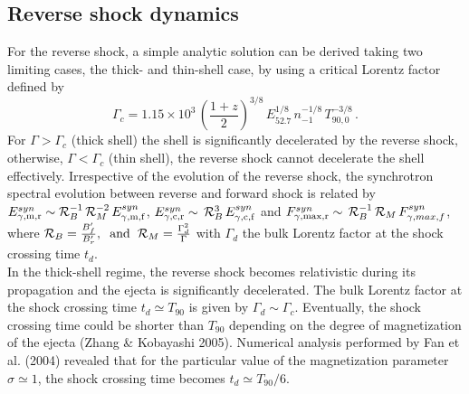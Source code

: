 \documentclass[11pt,twoside]{article}
\newcommand{\be}{\begin{equation}}
\newcommand{\ee}{\end{equation}}
\begin{document}
\subsection{Reverse shock dynamics}
%
For the reverse shock, a simple analytic solution can be derived taking two limiting cases, the thick- and thin-shell case, by using a critical Lorentz factor defined by 
%
\be
\Gamma_c=1.15\times 10^3\,\left(\frac{1+z}{2} \right)^{3/8}\, E^{1/8}_{52.7}\,n^{-1/8}_{-1}\,T_{90,0}^{-3/8}\,.
\ee
For $\Gamma>\Gamma_c$ (thick shell) the shell is significantly decelerated by the reverse shock, otherwise, $\Gamma<\Gamma_c$ (thin shell), the reverse shock cannot decelerate the shell effectively.    Irrespective of the evolution of the reverse shock,  the synchrotron  spectral evolution between reverse and forward shock is related by $E^{syn}_{\rm \gamma, m,r}\sim \mathcal{R}^{-1}_B\,\mathcal{R}^{-2}_M\,E^{syn}_{\rm \gamma,m,f}$,  $E^{syn}_{\rm \gamma,c,r}\sim\,\mathcal{R}^{3}_B\,E^{syn}_{\rm \gamma,c,f}$ and $F^{syn}_{\rm \gamma,max,r}\sim\,\mathcal{R}^{-1}_B\,\mathcal{R}_M\,F^{syn}_{\gamma,max,f}$, where $\mathcal{R}_B=\frac{B'_f}{B'_r},\hspace{0.2cm} {\rm and} \hspace{0.2cm} \mathcal{R}_M=\frac{\Gamma^2_{d}}{\Gamma}$ with $\Gamma_{d}$ the bulk Lorentz factor at the shock crossing time $t_d$.\\ 
%
%
%
\noindent  
%
%
In the thick-shell regime,  the reverse shock becomes relativistic during its propagation and the ejecta is significantly decelerated.  The bulk Lorentz factor at the shock crossing time  $t_d\simeq T_{90}$ is given by $\Gamma_{d}\sim \Gamma_c$.  Eventually,  the shock crossing time could be shorter than $T_{90}$ depending on the degree of magnetization of the ejecta (Zhang \& Kobayashi 2005).  Numerical analysis performed by Fan et al. (2004) revealed that for the particular value of the magnetization parameter $\sigma \simeq 1$, the shock crossing time becomes $t_d\simeq T_{90}/6$.\\
%
\end{document}
